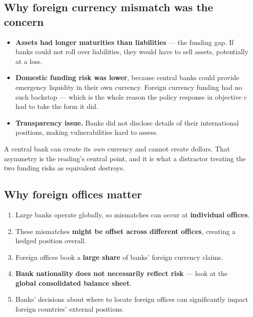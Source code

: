 \subsection{Why foreign currency mismatch was the concern}

\begin{itemize}
\item \textbf{Assets had longer maturities than liabilities} --- the funding gap. If banks could not roll over liabilities, they would have to sell assets, potentially at a loss.
\item \textbf{Domestic funding risk was lower}, because central banks could provide emergency liquidity in their own currency. Foreign currency funding had no such backstop --- which is the whole reason the policy response in objective c had to take the form it did.
\item \textbf{Transparency issue.} Banks did not disclose details of their international positions, making vulnerabilities hard to assess.
\end{itemize}

\begin{lrtrapbox}
A central bank can create its \emph{own} currency and cannot create dollars. That asymmetry is the reading's central point, and it is what a distractor treating the two funding risks as equivalent destroys.
\end{lrtrapbox}

\subsection{Why foreign offices matter}

\begin{enumerate}[label=\alph*)]
\item Large banks operate globally, so mismatches can occur at \textbf{individual offices}.
\item These mismatches \textbf{might be offset across different offices}, creating a hedged position overall.
\item Foreign offices book a \textbf{large share} of banks' foreign currency claims.
\item \textbf{Bank nationality does not necessarily reflect risk} --- look at the \textbf{global consolidated balance sheet}.
\item Banks' decisions about where to locate foreign offices can significantly impact foreign countries' external positions.
\end{enumerate}

